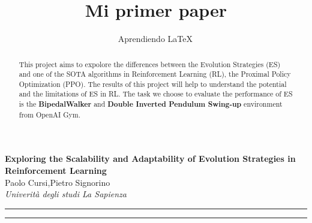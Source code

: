 \documentclass[10pt,a4paper]{article}
\author{Aprendiendo \LaTeX\,}
\title{Mi primer paper}
\begin{document}
	\vspace{7.5mm}
	
	\begin{center}
		{\Large \textbf{Exploring the Scalability and Adaptability of Evolution Strategies in Reinforcement Learning}}\\
		\vspace{2mm}
		{\large Paolo Cursi,Pietro Signorino}\\
		\vspace{7.5mm}
		\textit{Univerità degli studi La Sapienza}\\
	\end{center}

	\begin{center}
		\textcolor{azul}{\rule{150mm}{0.5mm}}
	\end{center}		

	\begin{abstract}
		This project aims to expolore the differences between the Evolution Strategies (ES) and one of the SOTA algorithms in Reinforcement Learning (RL), the Proximal Policy Optimization (PPO). The results of this project will help to understand the potential and the limitations of ES in RL. The task we choose to evaluate the performance of ES is the \textbf{BipedalWalker} and \textbf{Double Inverted Pendulum Swing-up} environment from OpenAI Gym. 
	\end{abstract}
	\begin{center}
		\textcolor{azul}{\rule{150mm}{0.5mm}}
	\end{center}		

	\vspace{5mm}
	
\end{document}

